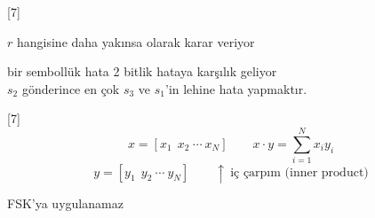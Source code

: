 \documentclass[11pt,a4paper]{article}
\begin{document}
[7]

$r$ hangisine daha yakınsa  olarak karar veriyor

bir sembollük hata 2 bitlik hataya karşılık geliyor\\
$s_2$ gönderince en çok $s_3$ ve $s_1$'in lehine hata yapmaktır.

[7]
\[ x=[x_1\ \ x_2\ \cdots\ x_N]\qquad x\cdot y=\sum_{i=1}^{N}x_iy_i \]
\[ y=[y_1\ \ y_2\ \cdots\ y_N]\qquad \uparrow\ \text{iç çarpım (inner product)} \]

FSK'ya uygulanamaz
\end{document}
